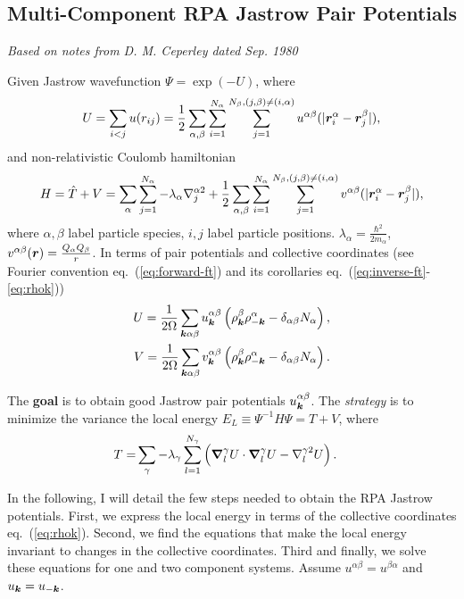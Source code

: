 \subsection{Multi-Component RPA Jastrow Pair Potentials}

\textit{Based on notes from D. M. Ceperley dated Sep. 1980}

Given Jastrow wavefunction $\Psi=\exp(-U)$, where
\begin{align}
U = \sum\limits_{i<j} u(r_{ij}) = \frac{1}{2} \sum\limits_{\alpha, \beta} \sum\limits_{i=1}^{N_\alpha} \sum\limits_{j=1}^{N_\beta, (j,\beta)\neq(i,\alpha)}
u^{\alpha\beta}(\vert\boldsymbol{r}_i^\alpha-\boldsymbol{r}_j^\beta\vert), \label{eq:Uurij}
\end{align}
and non-relativistic Coulomb hamiltonian
\begin{align}
H = \hat{T}+V = \sum\limits_{\alpha}\sum\limits_{j=1}^{N_\alpha} -\lambda_{\alpha}\nabla^{\alpha2}_j + \frac{1}{2}\sum\limits_{\alpha, \beta} \sum\limits_{i=1}^{N_\alpha} \sum\limits_{j=1}^{N_\beta, (j,\beta)\neq(i,\alpha)} v^{\alpha\beta}(\vert\boldsymbol{r}_i^\alpha - \boldsymbol{r}_j^\beta \vert),
\end{align}
where $\alpha, \beta$ label particle species, $i, j$ label particle positions. $\lambda_\alpha=\frac{\hbar^2}{2m_\alpha}$, $v^{\alpha\beta}(\boldsymbol{r})=\frac{Q_\alpha Q_\beta}{r}$. In terms of pair potentials and collective coordinates (see Fourier convention eq.~(\ref{eq:forward-ft}) and its corollaries eq.~(\ref{eq:inverse-ft}-\ref{eq:rhok}))
\begin{align}
U = \frac{1}{2\Omega} \sum\limits_{\boldsymbol{k}\alpha\beta}
u^{\alpha\beta}_{\boldsymbol{k}} \left( \rho^\beta_{\boldsymbol{k}}\rho^\alpha_{-\boldsymbol{k}}-\delta_{\alpha\beta}N_\alpha
\right), \label{eq:Uuk} \\
V = \frac{1}{2\Omega} \sum\limits_{\boldsymbol{k}\alpha\beta}
v^{\alpha\beta}_{\boldsymbol{k}} \left( \rho^\beta_{\boldsymbol{k}}\rho^\alpha_{-\boldsymbol{k}}-\delta_{\alpha\beta}N_\alpha \right).
\end{align}

The \textbf{goal} is to obtain good Jastrow pair potentials $u_{\boldsymbol{k}}^{\alpha\beta}$. The \textit{strategy} is to minimize the variance the local energy $E_L\equiv \Psi^{-1}H\Psi = T + V$, where
\begin{align}
T =& \sum\limits_{\gamma}-\lambda_{\gamma}
\sum\limits_{l=1}^{N_\gamma}  \left(\boldsymbol{\nabla}_l^{\gamma}U\cdot\boldsymbol{\nabla}_l^{\gamma}U - \nabla^{\gamma2}_l U \right).
\end{align}

In the following, I will detail the few steps needed to obtain the RPA Jastrow potentials. First, we express the local energy in terms of the collective coordinates eq.~(\ref{eq:rhok}). Second, we find the equations that make the local energy invariant to changes in the collective coordinates. Third and finally, we solve these equations for one and two component systems. Assume $u^{\alpha\beta}=u^{\beta\alpha}$ and $u_{\boldsymbol{k}}=u_{-\boldsymbol{k}}$.

